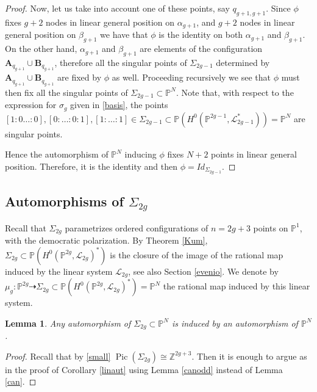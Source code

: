 \documentclass[a4paper,10pt]{amsart}
\newtheorem{Lemma}[thm]{Lemma}
\theoremstyle{definition}
\renewcommand{\P}{\mathbb{P}}
\DeclareMathOperator{\Pic}{Pic}
\begin{document}
\begin{proof}
Now, let us take into account one of these points, say $q_{g+1,g+1}$. Since $\phi$ fixes $g+2$ nodes in linear general position on $\alpha_{g+1}$, and $g+2$ nodes in linear general position on $\beta_{g+1}$ we have that $\phi$ is the identity on both $\alpha_{g+1}$ and $\beta_{g+1}$. On the other hand, $\alpha_{g+1}$ and $\beta_{g+1}$ are elements of the configuration $\textbf{A}_{q_{g+1}}\cup \textbf{B}_{q_{g+1}}$, therefore all the singular points of $\Sigma_{2g-1}$ determined by $\textbf{A}_{q_{g+1}}\cup \textbf{B}_{q_{g+1}}$ are fixed by $\phi$ as well. Proceeding recursively we see that $\phi$ must then fix all the singular points of $\Sigma_{2g-1}\subset\mathbb{P}^{N}$. Note that, with respect to the expression for $\sigma_g$ given in \ref{basis}, the points $[1:0\dots:0],[0:\dots:0:1],[1:\dots:1]\in \Sigma_{2g-1}\subset \mathbb{P}(H^{0}(\mathbb{P}^{2g-1},\mathcal{L}_{2g-1}^{*})) = \mathbb{P}^N$ are singular points.

Hence the automorphism of $\mathbb{P}^N$ inducing $\phi$ fixes $N+2$ points in linear general position. Therefore, it is the identity and then $\phi = Id_{\Sigma_{2g-1}}$.  
\end{proof}
 
\subsection{Automorphisms of $\Sigma_{2g}$} 
Recall that $\Sigma_{2g}$ parametrizes ordered configurations of $n=2g+3$ points on $\P^1$, with the democratic polarization. By Theorem \ref{Kum}, $\Sigma_{2g}\subset \mathbb{P}(H^0(\mathbb{P}^{2g},\mathcal{L}_{2g})^{*})$
is the closure of the image of the rational map induced by the linear system $\mathcal{L}_{2g}$, see also Section \ref{evenio}. We denote by $\mu_g:\mathbb{P}^{2g}\dasharrow \Sigma_{2g}\subset \mathbb{P}(H^0(\mathbb{P}^{2g},\mathcal{L}_{2g})^{*}) = \mathbb{P}^N$ the rational map induced by this linear system.

\begin{Lemma}\label{linautodd}
Any automorphism of $\Sigma_{2g}\subset\mathbb{P}^N$ is induced by an automorphism of $\mathbb{P}^N$.
\end{Lemma} 
\begin{proof}
Recall that by \ref{small} $\Pic(\Sigma_{2g})\cong\mathbb{Z}^{2g+3}$. Then it is enough to argue as in the proof of Corollary \ref{linaut} using Lemma \ref{canodd} instead of Lemma \ref{can}.
\end{proof}
\end{document}

